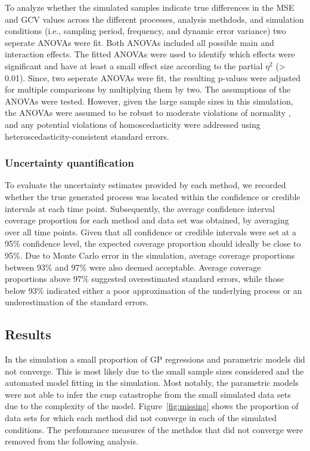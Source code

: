 \documentclass[man, floatsintext]{apa7}
\begin{document}
To analyze whether the simulated samples indicate true differences in the
MSE and GCV values across the different processes, analysis methdods, and
simulation conditions (i.e., sampling period, frequency, and dynamic error
variance) two seperate ANOVAs were fit. Both ANOVAs included all possible main
and interaction effects. The fitted ANOVAs were used to identify which effects
were significant and have at least a small effect size according to the partial
$\eta^2$ (> 0.01). Since, two seperate ANOVAs were fit, the resulting p-values
were adjusted for multiple comparisons by multiplying them by two. The
assumptions of the ANOVAs were tested. However, given the large sample sizes in
this simulation, the ANOVAs were assumed to be robust to moderate violations of
normality \parencite{blanca_non-normal_2017}, and any potential violations of
homoscedasticity were addressed using heteroscedasticity-consistent standard
errors.

\subsubsection{Uncertainty quantification}

To evaluate the uncertainty estimates provided by each method, we recorded
whether the true generated process was located within the confidence or
credible intervals at each time point. Subsequently, the average confidence
interval coverage proportion for each method and data set was obtained, by
averaging over all time points. Given that all confidence or credible intervals
were set at a 95\% confidence level, the expected coverage proportion should
ideally be close to 95\%. Due to Monte Carlo error in the simulation, average
coverage proportions between 93\% and 97\% were also deemed acceptable. Average
coverage proportions above 97\% suggested overestimated standard errors, while
those below 93\% indicated either a poor approximation of the underlying
process or an underestimation of the standard errors.

\subsection{Results}

In the simulation a small proportion of GP regressions and parametric models
did not converge. This is most likely due to the small sample sizes considered
and the automated model fitting in the simulation. Most notably, the parametric
models were not able to infer the cusp catastrophe from the small simulated
data sets due to the complexity of the model. Figure~\ref{fig:missing} shows
the proportion of data sets for which each method did not converge in each
of the simulated conditions. The perfomrance measures of the methdos that
did not converge were removed from the following analysis.
\end{document}
